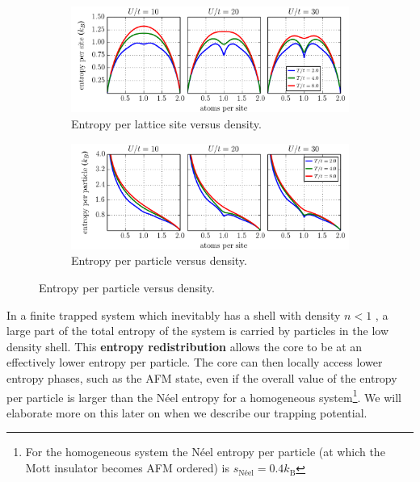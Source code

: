 \begin{figure}
        \centering
        \begin{subfigure}[b]{0.65\textwidth}
    \includegraphics[width=\textwidth]{../figures/lda_evap/HTSE_EntropyPerSite_U.png}
    \caption{Entropy per lattice site versus density.}\label{fig:HTSE_spersite}
     \end{subfigure}

\begin{subfigure}[b]{0.65\textwidth}
    \includegraphics[width=\textwidth]{../figures/lda_evap/HTSE_EntropyPerParticle_U.png}
    \caption{Entropy per particle versus density.}\label{fig:HTSE_sperparticle}
   \end{subfigure}
\end{figure}

In a finite trapped system which inevitably has a shell with density $n<1$ , a
large part of the total entropy of the system is carried by particles in the
low density shell.  This \textbf{entropy redistribution} allows the core to be
at an effectively lower entropy per particle.  The core can then locally access
lower entropy phases, such as the AFM state,  even if the overall value of the
entropy per particle is larger than the N\'{e}el entropy for a homogeneous
system\footnote{ For the homogeneous system the N\'{e}el entropy per particle
(at which the Mott insulator becomes AFM ordered) is $s_{\text{N\'{e}el}} = 0.4
k_{\text{B}}$}.  We will elaborate more on this later on when we describe our
trapping potential. 


